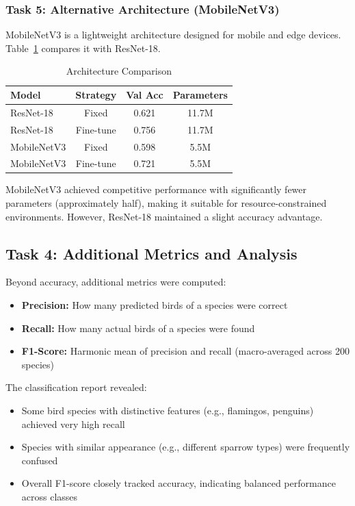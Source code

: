 \documentclass[conference]{IEEEtran}
\begin{document}
\subsubsection{Task 5: Alternative Architecture (MobileNetV3)}

MobileNetV3 is a lightweight architecture designed for mobile and edge devices. Table~\ref{tab:lab2_mobilenet} compares it with ResNet-18.

\begin{table}[H]
\centering
\caption{Architecture Comparison}
\label{tab:lab2_mobilenet}
\begin{tabular}{@{}lccc@{}}
\toprule
\textbf{Model} & \textbf{Strategy} & \textbf{Val Acc} & \textbf{Parameters} \\ \midrule
ResNet-18 & Fixed & 0.621 & 11.7M \\
ResNet-18 & Fine-tune & 0.756 & 11.7M \\
MobileNetV3 & Fixed & 0.598 & 5.5M \\
MobileNetV3 & Fine-tune & 0.721 & 5.5M \\ \bottomrule
\end{tabular}
\end{table}

MobileNetV3 achieved competitive performance with significantly fewer parameters (approximately half), making it suitable for resource-constrained environments. However, ResNet-18 maintained a slight accuracy advantage.

\subsection{Task 4: Additional Metrics and Analysis}

Beyond accuracy, additional metrics were computed:
\begin{itemize}
\item \textbf{Precision:} How many predicted birds of a species were correct
\item \textbf{Recall:} How many actual birds of a species were found
\item \textbf{F1-Score:} Harmonic mean of precision and recall (macro-averaged across 200 species)
\end{itemize}

The classification report revealed:
\begin{itemize}
\item Some bird species with distinctive features (e.g., flamingos, penguins) achieved very high recall
\item Species with similar appearance (e.g., different sparrow types) were frequently confused
\item Overall F1-score closely tracked accuracy, indicating balanced performance across classes
\end{itemize}
\end{document}
